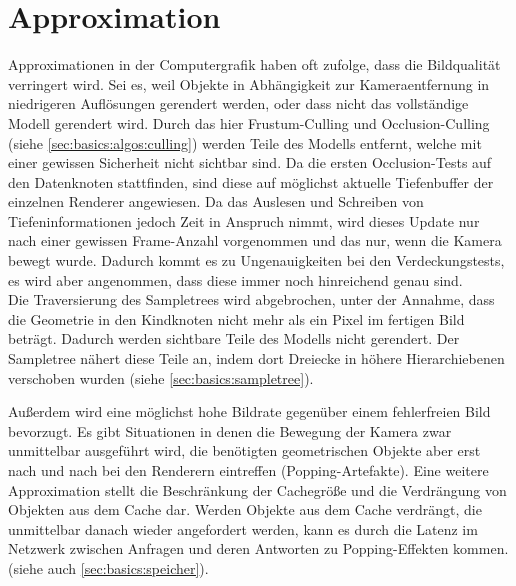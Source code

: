 \section{Approximation}
\label{sec:basics:approximation}
Approximationen in der Computergrafik haben oft zufolge, dass die Bildqualität verringert wird. Sei es, weil Objekte in Abhängigkeit zur Kameraentfernung in niedrigeren Auflösungen gerendert werden, oder dass nicht das vollständige Modell gerendert wird.
Durch das hier Frustum-Culling und Occlusion-Culling (siehe \ref{sec:basics:algos:culling}) werden Teile des Modells entfernt, welche mit einer gewissen Sicherheit nicht sichtbar sind. Da die ersten Occlusion-Tests auf den Datenknoten stattfinden, sind diese auf möglichst aktuelle Tiefenbuffer der einzelnen Renderer angewiesen. Da das Auslesen und Schreiben von Tiefeninformationen jedoch Zeit in Anspruch nimmt, wird dieses Update nur nach einer gewissen Frame-Anzahl vorgenommen und das nur, wenn die Kamera bewegt wurde. Dadurch kommt es zu Ungenauigkeiten bei den Verdeckungstests, es wird aber angenommen, dass diese immer noch hinreichend genau sind. \\
Die Traversierung des Sampletrees wird abgebrochen, unter der Annahme, dass die Geometrie in den Kindknoten nicht mehr als ein Pixel im fertigen Bild beträgt. Dadurch werden sichtbare Teile des Modells nicht gerendert. Der Sampletree nähert diese Teile an, indem dort Dreiecke in höhere Hierarchiebenen verschoben wurden (siehe \ref{sec:basics:sampletree}).

Außerdem wird eine möglichst hohe Bildrate gegenüber einem fehlerfreien Bild bevorzugt. Es gibt Situationen in denen die Bewegung der Kamera zwar unmittelbar ausgeführt wird, die benötigten geometrischen Objekte aber erst nach und nach bei den Renderern eintreffen (Popping-Artefakte). Eine weitere Approximation stellt die Beschränkung der Cachegröße und die Verdrängung von Objekten aus dem Cache dar. Werden Objekte aus dem Cache verdrängt, die unmittelbar danach wieder angefordert werden, kann es durch die Latenz im Netzwerk zwischen Anfragen und deren Antworten zu Popping-Effekten kommen. (siehe auch \ref{sec:basics:speicher}). 
